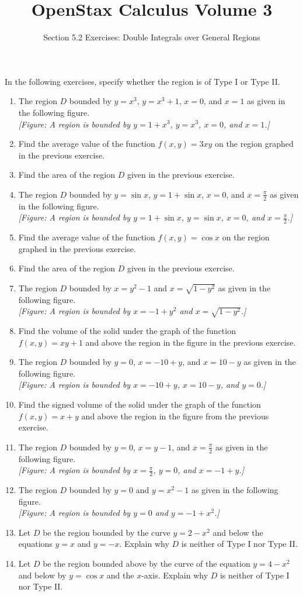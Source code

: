 \documentclass{exercises}
\title{OpenStax Calculus Volume 3}
\subtitle{Section 5.2 Exercises: Double Integrals over General Regions}
\author{}
\date{}
\begin{document}
\maketitle


In the following exercises, specify whether the region is of Type I or Type II.

\begin{enumerate}[start=1]
\item The region $D$ bounded by $y=x^{3}$, $y=x^{3}+1$, $x=0$, and $x=1$ as given in the following figure. \\ \textit{[Figure: A region is bounded by $y=1+x^3$, $y=x^3$, $x=0$, and $x=1$.]}
\item Find the average value of the function $f(x,y)=3xy$ on the region graphed in the previous exercise.
\item Find the area of the region $D$ given in the previous exercise.
\item The region $D$ bounded by $y=\sin x$, $y=1+\sin x$, $x=0$, and $x=\frac{\pi}{2}$ as given in the following figure. \\ \textit{[Figure: A region is bounded by $y=1+\sin x$, $y=\sin x$, $x=0$, and $x=\frac{\pi}{2}$.]}
\item Find the average value of the function $f(x,y)=\cos x$ on the region graphed in the previous exercise.
\item Find the area of the region $D$ given in the previous exercise.
\item The region $D$ bounded by $x=y^{2}-1$ and $x=\sqrt{1-y^{2}}$ as given in the following figure. \\ \textit{[Figure: A region is bounded by $x=-1+y^2$ and $x=\sqrt{1-y^2}$.]}
\item Find the volume of the solid under the graph of the function $f(x,y)=xy+1$ and above the region in the figure in the previous exercise.
\item The region $D$ bounded by $y=0$, $x=-10+y$, and $x=10-y$ as given in the following figure. \\ \textit{[Figure: A region is bounded by $x=-10+y$, $x=10-y$, and $y=0$.]}
\item Find the signed volume of the solid under the graph of the function $f(x,y)=x+y$ and above the region in the figure from the previous exercise.
\item The region $D$ bounded by $y=0$, $x=y-1$, and $x=\frac{\pi}{2}$ as given in the following figure. \\ \textit{[Figure: A region is bounded by $x=\frac{\pi}{2}$, $y=0$, and $x=-1+y$.]}
\item The region $D$ bounded by $y=0$ and $y=x^{2}-1$ as given in the following figure. \\ \textit{[Figure: A region is bounded by $y=0$ and $y=-1+x^2$.]}
\item Let $D$ be the region bounded by the curve $y=2-x^{2}$ and below the equations $y=x$ and $y=-x$. Explain why $D$ is neither of Type I nor Type II.
\item Let $D$ be the region bounded above by the curve of the equation $y=4-x^{2}$ and below by $y=\cos x$ and the $x$-axis. Explain why $D$ is neither of Type I nor Type II.
\end{enumerate}
\end{document}
